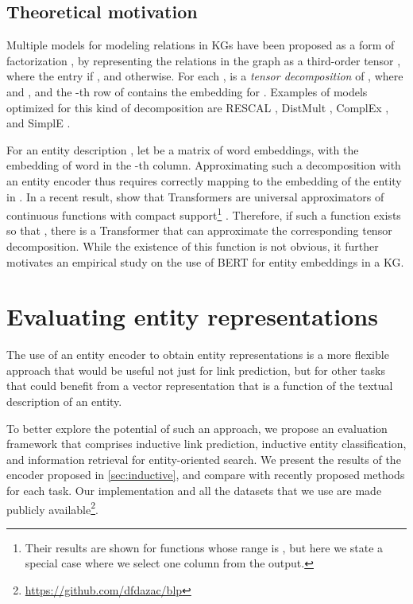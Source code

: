\documentclass[sigconf]{acmart}
\begin{document}
\subsection{Theoretical motivation}

Multiple models for modeling relations in KGs have been proposed as a form of factorization \citep{kolda2009tensor,nickel2015review}, by representing the relations in the graph as a third-order tensor , where the entry  if , and  otherwise. For each ,  is a \textit{tensor decomposition} of , where  and , and the -th row of  contains the embedding  for . Examples of models optimized for this kind of decomposition are RESCAL \citep{nickel2011three}, DistMult \citep{yang2015embedding}, ComplEx \citep{trouillon2016complex}, and SimplE \citep{kazemi2018simple}.


For an entity description , let  be a matrix of word embeddings, with the embedding of word  in the -th column. Approximating such a decomposition with an entity encoder thus requires correctly mapping  to the embedding of the entity  in . In a recent result, \citet{Yun2020Are} show that Transformers are universal approximators of continuous functions with compact support\footnote{Their results are shown for functions whose range is , but here we state a special case where we select one column from the output.} . Therefore, if such a function exists so that , there is a Transformer that can approximate the corresponding tensor decomposition. While the existence of this function is not obvious, it further motivates an empirical study on the use of BERT for entity embeddings in a KG.

\section{Evaluating entity representations}
\label{sec:experiments}

The use of an entity encoder to obtain entity representations is a more flexible approach that would be useful not just for link prediction, but for other tasks that could benefit from a vector representation that is a function of the textual description of an entity.

To better explore the potential of such an approach, we propose an evaluation framework that comprises inductive link prediction, inductive entity classification, and information retrieval for entity-oriented search. We present the results of the encoder proposed in \autoref{sec:inductive}, and compare with recently proposed methods for each task. Our implementation and all the datasets that we use are made publicly available\footnote{\url{https://github.com/dfdazac/blp}}.
\end{document}
